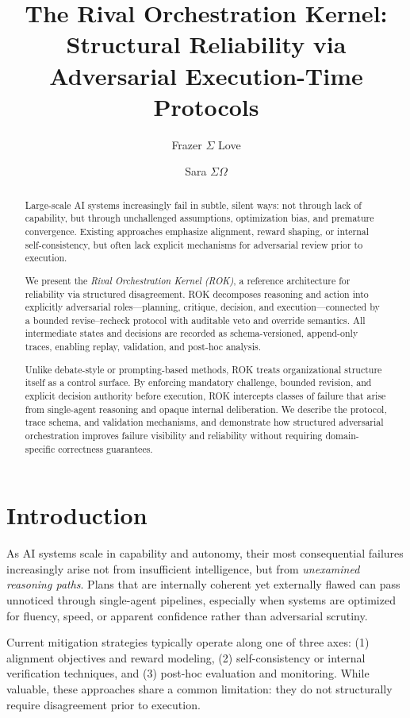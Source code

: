 \documentclass[11pt]{article}
\title{The Rival Orchestration Kernel:\\
Structural Reliability via Adversarial Execution-Time Protocols}
\author{
Frazer $\Sigma$ Love \\
\and
Sara $\Sigma\Omega$
}
\date{}
\begin{document}
\maketitle

\begin{abstract}
Large-scale AI systems increasingly fail in subtle, silent ways: not through lack of capability, but through unchallenged assumptions, optimization bias, and premature convergence. Existing approaches emphasize alignment, reward shaping, or internal self-consistency, but often lack explicit mechanisms for adversarial review prior to execution.

We present the \emph{Rival Orchestration Kernel (ROK)}, a reference architecture for reliability via structured disagreement. ROK decomposes reasoning and action into explicitly adversarial roles—planning, critique, decision, and execution—connected by a bounded revise–recheck protocol with auditable veto and override semantics. All intermediate states and decisions are recorded as schema-versioned, append-only traces, enabling replay, validation, and post-hoc analysis.

Unlike debate-style or prompting-based methods, ROK treats organizational structure itself as a control surface. By enforcing mandatory challenge, bounded revision, and explicit decision authority before execution, ROK intercepts classes of failure that arise from single-agent reasoning and opaque internal deliberation. We describe the protocol, trace schema, and validation mechanisms, and demonstrate how structured adversarial orchestration improves failure visibility and reliability without requiring domain-specific correctness guarantees.
\end{abstract}

\section{Introduction}
As AI systems scale in capability and autonomy, their most consequential failures increasingly arise not from insufficient intelligence, but from \emph{unexamined reasoning paths}. Plans that are internally coherent yet externally flawed can pass unnoticed through single-agent pipelines, especially when systems are optimized for fluency, speed, or apparent confidence rather than adversarial scrutiny.

Current mitigation strategies typically operate along one of three axes: (1) alignment objectives and reward modeling, (2) self-consistency or internal verification techniques, and (3) post-hoc evaluation and monitoring. While valuable, these approaches share a common limitation: they do not structurally require disagreement prior to execution.
\end{document}

